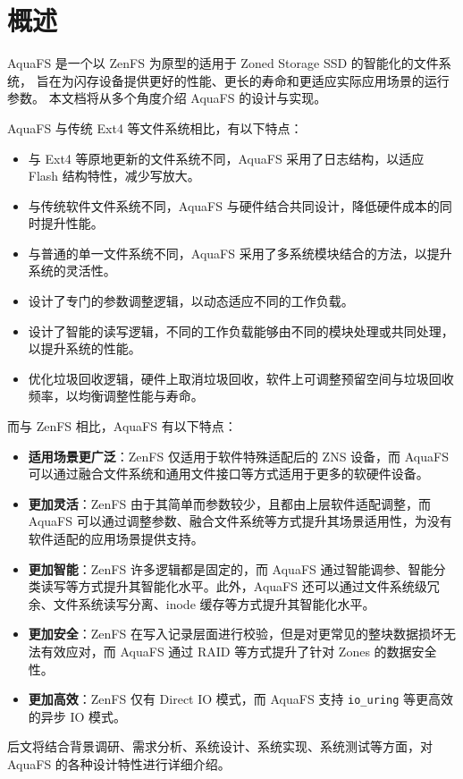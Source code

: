 \label{overview}
\section{概述}

AquaFS 是一个以 ZenFS 为原型的适用于 Zoned Storage SSD 的智能化的文件系统，
旨在为闪存设备提供更好的性能、更长的寿命和更适应实际应用场景的运行参数。
本文档将从多个角度介绍 AquaFS 的设计与实现。

AquaFS 与传统 Ext4 等文件系统相比，有以下特点：

\begin{itemize}
    \item 与 Ext4 等原地更新的文件系统不同，AquaFS 采用了日志结构，以适应 Flash 结构特性，减少写放大。
    \item 与传统软件文件系统不同，AquaFS 与硬件结合共同设计，降低硬件成本的同时提升性能。
    \item 与普通的单一文件系统不同，AquaFS 采用了多系统模块结合的方法，以提升系统的灵活性。
    \item 设计了专门的参数调整逻辑，以动态适应不同的工作负载。
    \item 设计了智能的读写逻辑，不同的工作负载能够由不同的模块处理或共同处理，以提升系统的性能。
    \item 优化垃圾回收逻辑，硬件上取消垃圾回收，软件上可调整预留空间与垃圾回收频率，以均衡调整性能与寿命。
\end{itemize}

而与 ZenFS 相比，AquaFS 有以下特点：

\begin{itemize}
    \item \textbf{适用场景更广泛}：ZenFS 仅适用于软件特殊适配后的 ZNS 设备，而 AquaFS 可以通过融合文件系统和通用文件接口等方式适用于更多的软硬件设备。
    \item \textbf{更加灵活}：ZenFS 由于其简单而参数较少，且都由上层软件适配调整，而 AquaFS 可以通过调整参数、融合文件系统等方式提升其场景适用性，为没有软件适配的应用场景提供支持。
    \item \textbf{更加智能}：ZenFS 许多逻辑都是固定的，而 AquaFS 通过智能调参、智能分类读写等方式提升其智能化水平。此外，AquaFS 还可以通过文件系统级冗余、文件系统读写分离、inode 缓存等方式提升其智能化水平。
    \item \textbf{更加安全}：ZenFS 在写入记录层面进行校验，但是对更常见的整块数据损坏无法有效应对，而 AquaFS 通过 RAID 等方式提升了针对 Zones 的数据安全性。
    \item \textbf{更加高效}：ZenFS 仅有 Direct IO 模式，而 AquaFS 支持 \verb|io_uring| 等更高效的异步 IO 模式。
\end{itemize}

后文将结合背景调研、需求分析、系统设计、系统实现、系统测试等方面，对 AquaFS 的各种设计特性进行详细介绍。
